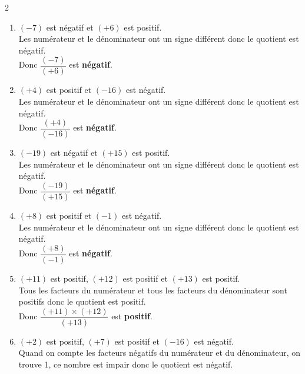\begin{corrige}
    \phantom{rrr}
      \begin{multicols}2
        \begin{enumerate}
            \item $ (-7) $ est négatif et $ (+6) $ est positif.\\
            Les numérateur et le dénominateur ont un signe différent donc le quotient est négatif.\\
           Donc $ \dfrac{(-7)}{(+6)} $ est {\bfseries \color[HTML]{f15929}négatif}.
            \item $ (+4) $ est positif et $ (-16) $ est négatif.\\
            Les numérateur et le dénominateur ont un signe différent donc le quotient est négatif.\\
           Donc $ \dfrac{(+4)}{(-16)} $ est {\bfseries \color[HTML]{f15929}négatif}.
            \item $ (-19) $ est négatif et $ (+15) $ est positif.\\
            Les numérateur et le dénominateur ont un signe différent donc le quotient est négatif.\\
           Donc $ \dfrac{(-19)}{(+15)} $ est {\bfseries \color[HTML]{f15929}négatif}.
            \item $ (+8) $ est positif et $ (-1) $ est négatif.\\
            Les numérateur et le dénominateur ont un signe différent donc le quotient est négatif.\\
           Donc $ \dfrac{(+8)}{(-1)} $ est {\bfseries \color[HTML]{f15929}négatif}.
            \item $ (+11) $ est positif, $ (+12) $ est positif et $ (+13) $ est positif.\\
           Tous les facteurs du numérateur et tous les facteurs du dénominateur sont positifs donc le quotient est positif.\\
          Donc $ \dfrac{(+11) \times (+12)}{(+13)} $ est {\bfseries \color[HTML]{f15929}positif}.
          \columnbreak
            \item $ (+2) $ est positif, $ (+7) $ est positif et $ (-16) $ est négatif.\\
           Quand on compte les facteurs négatifs du numérateur et du dénominateur, on trouve 1, ce nombre est impair donc le quotient est négatif.\\

\end{enumerate}
\end{multicols}
\end{corrige}
